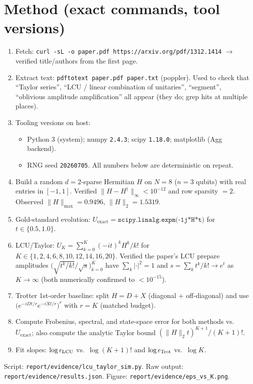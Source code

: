 \documentclass[11pt]{article}
\begin{document}
\section{Method (exact commands, tool versions)}
\begin{enumerate}
\item Fetch: \texttt{curl -sL -o paper.pdf https://arxiv.org/pdf/1312.1414} $\to$ verified title/authors from the first page.
\item Extract text: \texttt{pdftotext paper.pdf paper.txt} (poppler). Used to check that ``Taylor series'', ``LCU / linear combination of unitaries'', ``segment'', ``oblivious amplitude amplification'' all appear (they do; grep hits at multiple places).
\item Tooling versions on host:
\begin{itemize}
\item Python 3 (system); numpy \texttt{2.4.3}; scipy \texttt{1.18.0}; matplotlib (Agg backend).
\item RNG seed \texttt{20260705}. All numbers below are deterministic on repeat.
\end{itemize}
\item Build a random $d\!=\!2$-sparse Hermitian $H$ on $N\!=\!8$ ($n\!=\!3$ qubits) with real entries in $[-1,1]$. Verified $\|H-H^\dagger\|_\infty < 10^{-12}$ and row sparsity $=2$. Observed $\|H\|_{\max} = 0.9496$, $\|H\|_2 = 1.5319$.
\item Gold-standard evolution: $U_{\text{exact}} = \texttt{scipy.linalg.expm(-1j*H*t)}$ for $t\in\{0.5,1.0\}$.
\item LCU/Taylor: $U_K = \sum_{k=0}^K (-it)^k H^k / k!$ for $K\in\{1,2,4,6,8,10,12,14,16,20\}$. Verified the paper's LCU prepare amplitudes $\bigl(\sqrt{t^k/k!}/\sqrt{s}\bigr)_{k=0}^K$ have $\sum_k |\cdot|^2 = 1$ and $s=\sum_k t^k/k! \to e^t$ as $K\!\to\!\infty$ (both numerically confirmed to $<10^{-15}$).
\item Trotter 1st-order baseline: split $H=D+X$ (diagonal + off-diagonal) and use $\bigl(e^{-iD t/r}e^{-iX t/r}\bigr)^r$ with $r=K$ (matched budget).
\item Compute Frobenius, spectral, and state-space error for both methods vs.\ $U_{\text{exact}}$; also compute the analytic Taylor bound $(\|H\|_2 t)^{K+1}/(K+1)!$.
\item Fit slopes: $\log\epsilon_{\rm LCU}$ vs.\ $\log(K+1)!$ and $\log\epsilon_{\rm Trot}$ vs.\ $\log K$.
\end{enumerate}
Script: \texttt{report/evidence/lcu\_taylor\_sim.py}. Raw output: \texttt{report/evidence/results.json}. Figure: \texttt{report/evidence/eps\_vs\_K.png}.
\end{document}
